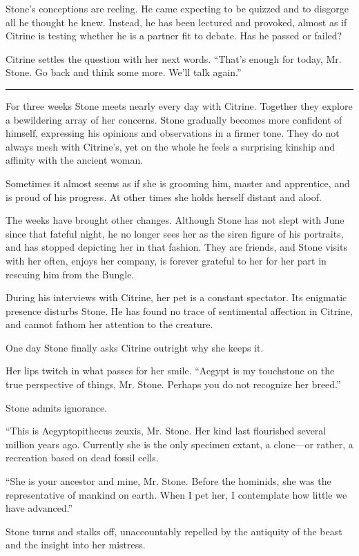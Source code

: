 Stone's conceptions are reeling. He came expecting to be quizzed and to disgorge all he thought he knew. Instead, he has been lectured and provoked, almost as if Citrine is testing whether he is a partner fit to debate. Has he passed or failed?

Citrine settles the question with her next words. ``That's enough for today, Mr. Stone. Go back and think some more. We'll talk again.''

\fancybreak{* * *}

For three weeks Stone meets nearly every day with Citrine. Together they explore a bewildering array of her concerns. Stone gradually becomes more confident of himself, expressing his opinions and observations in a firmer tone. They do not always mesh with Citrine's, yet on the whole he feels a surprising kinship and affinity with the ancient woman.

Sometimes it almost seems as if she is grooming him, master and apprentice, and is proud of his progress. At other times she holds herself distant and aloof.

The weeks have brought other changes. Although Stone has not slept with June since that fateful night, he no longer sees her as the siren figure of his portraits, and has stopped depicting her in that fashion. They are friends, and Stone visits with her often, enjoys her company, is forever grateful to her for her part in rescuing him from the Bungle.

During his interviews with Citrine, her pet is a constant spectator. Its enigmatic presence disturbs Stone. He has found no trace of sentimental affection in Citrine, and cannot fathom her attention to the creature.

One day Stone finally asks Citrine outright why she keeps it.

Her lips twitch in what passes for her smile. ``Aegypt is my touchstone on the true perspective of things, Mr. Stone. Perhaps you do not recognize her breed.''

Stone admits ignorance.

``This is Aegyptopithecus zeuxis, Mr. Stone. Her kind last flourished several million years ago. Currently she is the only specimen extant, a clone---or rather, a recreation based on dead fossil cells.

``She is your ancestor and mine, Mr. Stone. Before the hominids, she was the representative of mankind on earth. When I pet her, I contemplate how little we have advanced.''

Stone turns and stalks off, unaccountably repelled by the antiquity of the beast and the insight into her mistress.

